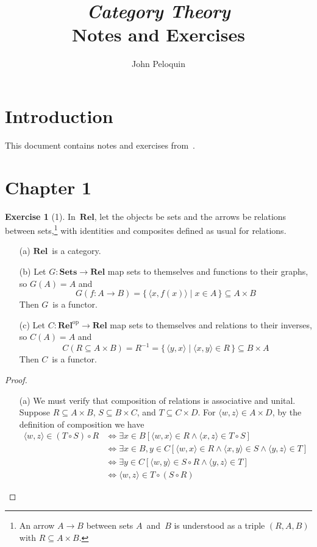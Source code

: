 \documentclass[letterpaper,12pt]{article}
\title{\textit{Category Theory}\\Notes and Exercises}
\author{John Peloquin}
\date{}
\newcommand{\after}{\circ}
\newcommand{\pair}[2]{\langle{#1},{#2}\rangle}
\newcommand{\inv}[1]{#1^{-1}}
\newcommand{\cat}[1]{\mathbf{#1}}
\newcommand{\dual}[1]{#1^{\mathrm{op}}}
\newcommand{\Rel}{\cat{Rel}}
\newcommand{\Relop}{\dual{\Rel}}
\newcommand{\Sets}{\cat{Sets}}
\theoremstyle{definition}
\newtheorem*{exer}{Exercise}
\theoremstyle{remark}
\theoremstyle{direction}
\begin{document}
\maketitle

\section*{Introduction}
This document contains notes and exercises from~\cite{awodey10}.

\section*{Chapter 1}
\begin{exer}[1]
In~\(\Rel\), let the objects be sets and the arrows be relations between sets,\footnote{An arrow \(A\to B\) between sets \(A\)~and~\(B\) is understood as a triple \((R,A,B)\) with \(R\subseteq A\times B\).} with identities and composites defined as usual for relations.
\begin{enumerate}[itemsep=0pt]
\item[(a)] \(\Rel\)~is a category.
\item[(b)] Let \(G:\Sets\to\Rel\) map sets to themselves and functions to their graphs, so \(G(A)=A\) and
\[G(f:A\to B)=\{\,\pair{x}{f(x)}\mid x\in A\,\}\subseteq A\times B\]
Then \(G\)~is a functor.
\item[(c)] Let \(C:\Relop\to\Rel\) map sets to themselves and relations to their inverses, so \(C(A)=A\) and
\[C(R\subseteq A\times B)=\inv{R}=\{\,\pair{y}{x}\mid\pair{x}{y}\in R\,\}\subseteq B\times A\]
Then \(C\)~is a functor.
\end{enumerate}
\begin{proof}\
\begin{enumerate}[itemsep=0pt]
\item[(a)] We must verify that composition of relations is associative and unital. Suppose \(R\subseteq A\times B\), \(S\subseteq B\times C\), and \(T\subseteq C\times D\). For \(\pair{w}{z}\in A\times D\), by the definition of composition we have
\begin{align*}
\pair{w}{z}\in(T\after S)\after R&\iff\exists x\in B[\pair{w}{x}\in R\land\pair{x}{z}\in T\after S]\\
								&\iff\exists x\in B,y\in C[\pair{w}{x}\in R\land\pair{x}{y}\in S\land\pair{y}{z}\in T]\\
								&\iff\exists y\in C[\pair{w}{y}\in S\after R\land\pair{y}{z}\in T]\\
								&\iff\pair{w}{z}\in T\after(S\after R)

\end{align*}
\end{enumerate}
\end{proof}
\end{exer}
\end{document}

